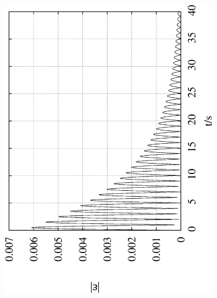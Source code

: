 \documentclass[10pt,a4paper]{article}
\begin{document}
\begin{figure}[t!]
\begin{center}
\includegraphics[scale = 0.3, angle =-90]{RungeKutta4_0.1_4000_0.2to40.eps}

\end{center}
\end{figure}
\end{document}
